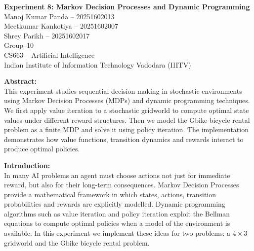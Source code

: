 \documentclass[14pt]{extreport}
\begin{document}
\begin{center}
\textbf{Experiment 8: Markov Decision Processes and Dynamic Programming}\\[0.8em]
Manoj Kumar Panda -- 20251602013\\
Meetkumar Kankotiya -- 20251602007\\
Shrey Parikh -- 20251602017\\[0.5em]
Group--10\\
CS663 -- Artificial Intelligence\\
Indian Institute of Information Technology Vadodara (IIITV)
\end{center}

\vspace{1em}

\noindent\textbf{Abstract:}\\
This experiment studies sequential decision making in stochastic environments
using Markov Decision Processes (MDPs) and dynamic programming techniques.
We first apply value iteration to a stochastic gridworld to compute optimal
state values under different reward structures. Then we model the Gbike
bicycle rental problem as a finite MDP and solve it using policy iteration.
The implementation demonstrates how value functions, transition dynamics and
rewards interact to produce optimal policies.

\vspace{1em}

\noindent\textbf{Introduction:}\\
In many AI problems an agent must choose actions not just for immediate
reward, but also for their long-term consequences. Markov Decision Processes
provide a mathematical framework in which states, actions, transition
probabilities and rewards are explicitly modelled. Dynamic programming
algorithms such as value iteration and policy iteration exploit the Bellman
equations to compute optimal policies when a model of the environment is
available. In this experiment we implement these ideas for two problems:
a $4 \times 3$ gridworld and the Gbike bicycle rental problem.

\vspace{1em}
\end{document}
